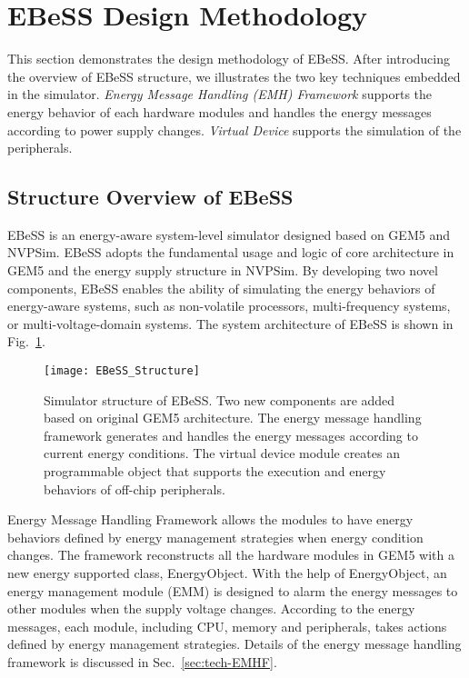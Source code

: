 \section{EBeSS Design Methodology}	\label{sec:tech}
%
This section demonstrates the design methodology of EBeSS.
After introducing the overview of EBeSS structure, we illustrates the two key techniques embedded in the simulator.
\emph{Energy Message Handling (EMH) Framework} supports the energy behavior of each hardware modules and handles the energy messages according to power supply changes.
\emph{Virtual Device} supports the simulation of the peripherals.

\subsection{Structure Overview of EBeSS}		\label{sec:tech-structure}
%
EBeSS is an energy-aware system-level simulator designed based on GEM5 and NVPSim. 
EBeSS adopts the fundamental usage and logic of core architecture in GEM5 and the energy supply structure in NVPSim.
By developing two novel components, EBeSS enables the ability of simulating the energy behaviors of energy-aware systems, such as non-volatile processors, multi-frequency systems, or multi-voltage-domain systems. 
The system architecture of EBeSS is shown in Fig.~\ref{fig:techStructure}.

\begin{figure}[!htpb]
	\centering
	\vspace{-10pt}
	\texttt{[image: EBeSS\_Structure]}
	\vspace{-20pt}
	\caption{Simulator structure of EBeSS. Two new components are added based on original GEM5 architecture. The energy message handling framework generates and handles the energy messages according to current energy conditions. The virtual device module creates an programmable object that supports the execution and energy behaviors of off-chip peripherals.}		\label{fig:techStructure}
\end{figure}

Energy Message Handling Framework allows the modules to have energy behaviors defined by energy management strategies when energy condition changes.
The framework reconstructs all the hardware modules in GEM5 with a new energy supported class, EnergyObject. 
With the help of EnergyObject, an energy management module (EMM) is designed to alarm the energy messages to other modules when the supply voltage changes.
According to the energy messages, each module, including CPU, memory and peripherals, takes actions defined by energy management strategies.
Details of the energy message handling framework is discussed in Sec.~\ref{sec:tech-EMHF}.

